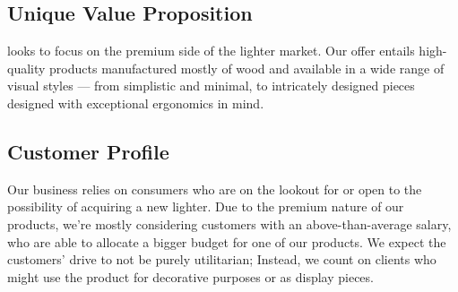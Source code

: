 \subsection{Unique Value Proposition}
{\fw} looks to focus on the premium side of the lighter market. Our offer entails high-quality products manufactured
mostly of wood and available in a wide range of visual styles --- from simplistic and minimal, to intricately designed
pieces designed with exceptional ergonomics in mind.
\subsection{Customer Profile}
Our business relies on consumers who are on the lookout for or open to the possibility of acquiring a new lighter.
Due to the premium nature of our products, we're mostly considering customers with an above-than-average salary,
who are able to allocate a bigger budget for one of our products.
We expect the customers' drive to not be purely utilitarian; Instead, we count on clients who might use
the product for decorative purposes or as display pieces.
